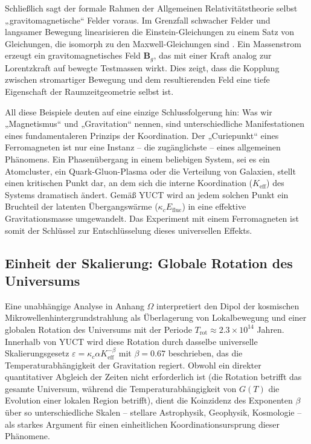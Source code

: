 \documentclass[12pt]{article}
\theoremstyle{remark}
\begin{document}
	Schließlich sagt der formale Rahmen der Allgemeinen Relativitätstheorie selbst „gravitomagnetische“ Felder voraus. Im Grenzfall schwacher Felder und langsamer Bewegung linearisieren die Einstein-Gleichungen zu einem Satz von Gleichungen, die isomorph zu den Maxwell-Gleichungen sind \cite{ciufolini1995}. Ein Massenstrom erzeugt ein gravitomagnetisches Feld $ \mathbf{B}_g$, das mit einer Kraft analog zur Lorentzkraft auf bewegte Testmassen wirkt. Dies zeigt, dass die Kopplung zwischen stromartiger Bewegung und dem resultierenden Feld eine tiefe Eigenschaft der Raumzeitgeometrie selbst ist.
	
	All diese Beispiele deuten auf eine einzige Schlussfolgerung hin: Was wir „Magnetismus“ und „Gravitation“ nennen, sind unterschiedliche Manifestationen eines fundamentaleren Prinzips der Koordination. Der „Curiepunkt“ eines Ferromagneten ist nur eine Instanz – die zugänglichste – eines allgemeinen Phänomens. Ein Phasenübergang in einem beliebigen System, sei es ein Atomcluster, ein Quark-Gluon-Plasma oder die Verteilung von Galaxien, stellt einen kritischen Punkt dar, an dem sich die interne Koordination ($K_{\mathrm{eff}}$) des Systems dramatisch ändert. Gemäß YUCT wird an jedem solchen Punkt ein Bruchteil der latenten Übergangswärme ($\kappa_c E_{\mathrm{fluc}}$) in eine effektive Gravitationsmasse umgewandelt. Das Experiment mit einem Ferromagneten ist somit der Schlüssel zur Entschlüsselung dieses universellen Effekts.
	
	\subsection{Einheit der Skalierung: Globale Rotation des Universums}
	
	Eine unabhängige Analyse in Anhang $\Omega$ interpretiert den Dipol der kosmischen Mikrowellenhintergrundstrahlung als Überlagerung von Lokalbewegung und einer globalen Rotation des Universums mit der Periode $T_{\mathrm{rot}} \approx 2.3\times10^{14}$ Jahren. Innerhalb von YUCT wird diese Rotation durch dasselbe universelle Skalierungsgesetz $\varepsilon = \kappa_c \alpha K_{\mathrm{eff}}^{-\beta}$ mit $\beta = 0.67$ beschrieben, das die Temperaturabhängigkeit der Gravitation regiert. Obwohl ein direkter quantitativer Abgleich der Zeiten nicht erforderlich ist (die Rotation betrifft das gesamte Universum, während die Temperaturabhängigkeit von $G(T)$ die Evolution einer lokalen Region betrifft), dient die Koinzidenz des Exponenten $\beta$ über so unterschiedliche Skalen – stellare Astrophysik, Geophysik, Kosmologie – als starkes Argument für einen einheitlichen Koordinationsursprung dieser Phänomene.
	
\end{document}
